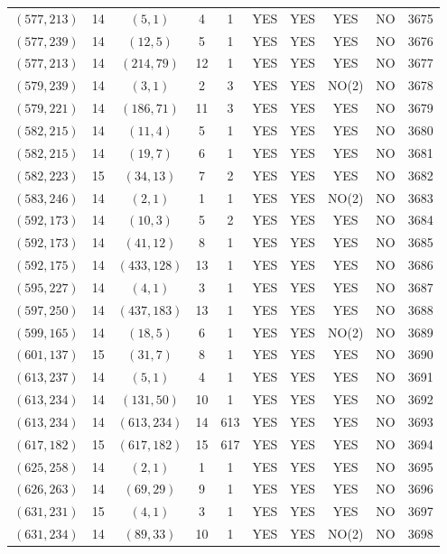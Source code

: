 \begin{longtable}{|c|c|c|c|c|c|c|c|c|c|}
$(577, 213)$ & 14 & $(5, 1)$ & 4 & 1 & YES & YES & YES & NO & 3675\\
$(577, 239)$ & 14 & $(12, 5)$ & 5 & 1 & YES & YES & YES & NO & 3676\\
$(577, 213)$ & 14 & $(214, 79)$ & 12 & 1 & YES & YES & YES & NO & 3677\\
$(579, 239)$ & 14 & $(3, 1)$ & 2 & 3 & YES & YES & NO(2) & NO & 3678\\
$(579, 221)$ & 14 & $(186, 71)$ & 11 & 3 & YES & YES & YES & NO & 3679\\
$(582, 215)$ & 14 & $(11, 4)$ & 5 & 1 & YES & YES & YES & NO & 3680\\
$(582, 215)$ & 14 & $(19, 7)$ & 6 & 1 & YES & YES & YES & NO & 3681\\
$(582, 223)$ & 15 & $(34, 13)$ & 7 & 2 & YES & YES & YES & NO & 3682\\
$(583, 246)$ & 14 & $(2, 1)$ & 1 & 1 & YES & YES & NO(2) & NO & 3683\\
$(592, 173)$ & 14 & $(10, 3)$ & 5 & 2 & YES & YES & YES & NO & 3684\\
$(592, 173)$ & 14 & $(41, 12)$ & 8 & 1 & YES & YES & YES & NO & 3685\\
$(592, 175)$ & 14 & $(433, 128)$ & 13 & 1 & YES & YES & YES & NO & 3686\\
$(595, 227)$ & 14 & $(4, 1)$ & 3 & 1 & YES & YES & YES & NO & 3687\\
$(597, 250)$ & 14 & $(437, 183)$ & 13 & 1 & YES & YES & YES & NO & 3688\\
$(599, 165)$ & 14 & $(18, 5)$ & 6 & 1 & YES & YES & NO(2) & NO & 3689\\
$(601, 137)$ & 15 & $(31, 7)$ & 8 & 1 & YES & YES & YES & NO & 3690\\
$(613, 237)$ & 14 & $(5, 1)$ & 4 & 1 & YES & YES & YES & NO & 3691\\
$(613, 234)$ & 14 & $(131, 50)$ & 10 & 1 & YES & YES & YES & NO & 3692\\
$(613, 234)$ & 14 & $(613, 234)$ & 14 & 613 & YES & YES & YES & NO & 3693\\
$(617, 182)$ & 15 & $(617, 182)$ & 15 & 617 & YES & YES & YES & NO & 3694\\
$(625, 258)$ & 14 & $(2, 1)$ & 1 & 1 & YES & YES & YES & NO & 3695\\
$(626, 263)$ & 14 & $(69, 29)$ & 9 & 1 & YES & YES & YES & NO & 3696\\
$(631, 231)$ & 15 & $(4, 1)$ & 3 & 1 & YES & YES & YES & NO & 3697\\
$(631, 234)$ & 14 & $(89, 33)$ & 10 & 1 & YES & YES & NO(2) & NO & 3698\\

\end{longtable}

